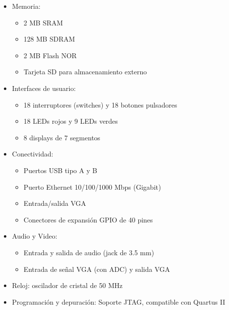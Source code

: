 \begin{itemize}
	\item Memoria:
		\begin{itemize}
			\item 2 MB SRAM
			\item 128 MB SDRAM
			\item 2 MB Flash NOR
			\item Tarjeta SD para almacenamiento externo
		\end{itemize}
	\item Interfaces de usuario:
		\begin{itemize}
			\item 18 interruptores (switches) y 18 botones pulsadores
			\item 18 LEDs rojos y 9 LEDs verdes
			\item 8 displays de 7 segmentos
		\end{itemize}
	\item Conectividad:
		\begin{itemize}
			\item Puertos USB tipo A y B
			\item Puerto Ethernet 10/100/1000 Mbps (Gigabit)
			\item Entrada/salida VGA
			\item Conectores de expansión GPIO de 40 pines
		\end{itemize}
	\item Audio y Video:
		\begin{itemize}
			\item Entrada y salida de audio (jack de 3.5 mm)
			\item Entrada de señal VGA (con ADC) y salida VGA
		\end{itemize}
	\item Reloj: oscilador de cristal de 50 MHz
	\item Programación y depuración: Soporte JTAG, compatible con Quartus II
\end{itemize}
 
